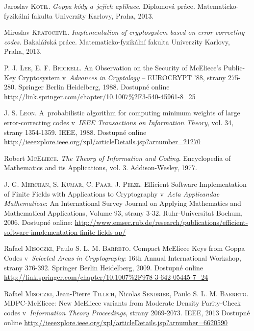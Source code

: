 \documentclass[thesis=M,czech,hidelinks]{FITthesis}[2012/06/26]
\newcommand{\0}{{\textcolor[gray]{0.75}{0}}}
\begin{document}
\begin{thebibliography}{99}
        Jaroslav \textsc{Kotil}. \emph{Goppa kódy a~jejich aplikace}. Diplomová
        práce. Matematicko-fyzikální fakulta Univerzity Karlovy, Praha, 2013.

        Miroslav \textsc{Kratochvíl}. \emph{Implementation of cryptosystem based
        on error-correcting codes}. Bakalářská práce. Matematicko-fyzikální
        fakulta Univerzity Karlovy, Praha, 2013.

        P. J. \textsc{Lee}, E. F. \textsc{Brickell}. An Observation on the
        Security of McEliece's Public-Key Cryptosystem v~\emph{Advances in
        Cryptology} -- EUROCRYPT '88, strany 275-280. Springer Berlin
        Heidelberg, 1988. Dostupné online
        \url{http://link.springer.com/chapter/10.1007\%2F3-540-45961-8\_25}

        J. S. \textsc{Leon}. A~probabilistic algorithm for computing minimum
        weights of large error-correcting codes v~\emph{IEEE Transactions on
        Information Theory}, vol. 34, strany 1354-1359. IEEE, 1988. Dostupné
        online
        \url{http://ieeexplore.ieee.org/xpl/articleDetails.jsp?arnumber=21270}

        Robert \textsc{McEliece}. \emph{The Theory of Information and Coding}.
        Encyclopedia of Mathematics and its Applications, vol. 3.
        Addison-Wesley, 1977.

        J. G. \textsc{Merchan}, S. \textsc{Kumar}, C. \textsc{Paar},
        J. \textsc{Pelzl}. Efficient Software Implementation of Finite
        Fields with Applications to Cryptography v~\emph{Acta Applicandae
        Mathematicae}: An International Survey Journal on Applying Mathematics
        and Mathematical Applications, Volume 93, strany  3-32.
        Ruhr-Universitat Bochum, 2006. Dostupné online:
        \url{http://www.emsec.rub.de/research/publications/efficient-software-implementation-finite-fields-ap/}

        Rafael \textsc{Misoczki}, Paulo S. L. M. \textsc{Barreto}. Compact
        McEliece Keys from Goppa Codes v~\emph{Selected Areas in Cryptography}:
        16th Annual International Workshop, strany 376-392. Springer Berlin
        Heidelberg, 2009. Dostupné online
        \url{http://link.springer.com/chapter/10.1007\%2F978-3-642-05445-7\_24}

        Rafael \textsc{Misoczki}, Jean-Pierre \textsc{Tillich}, Nicolas
        \textsc{Sendrier}, Paulo S. L. M. \textsc{Barreto}. MDPC-McEliece: New
        McEliece variants from Moderate Density Parity-Check codes
        v~\emph{Information Theory Proceedings}, strany 2069-2073. IEEE, 2013
        Dostupné online
        \url{http://ieeexplore.ieee.org/xpl/articleDetails.jsp?arnumber=6620590}


\end{thebibliography}
\end{document}
